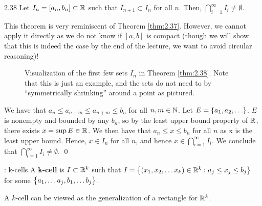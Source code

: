 \begin{theorem}{}{2.38}
    Let $I_n = [a_n, b_n] \subset \mathbb{R}$ such that $I_{n+1} \subset I_n$ for all $n$. Then, $\bigcap_{i=1}^\infty I_i \neq \emptyset$. 
\end{theorem}
\noindent This theorem is very reminiscent of Theorem \ref{thm:2.37}. However, we cannot apply it directly as we do not know if $[a, b]$ is compact (though we will show that this is indeed the case by the end of the lecture, we want to avoid circular reasoning)!
\begin{figure}[htbp]
    \centering
    \caption{Visualization of the first few sets $I_n$ in Theorem \ref{thm:2.38}. Note that this is just an example, and the sets do not need to by ``symmetrically shrinking'' around a point as pictured.}
    \label{fig12}
\end{figure}

\begin{nproof}
    We have that $a_n \leq a_{n + m} \leq a_{n + m} \leq b_n$ for all $n, m \in \mathbb{N}$. Let $E = \set{a_1, a_2, \ldots}$. $E$ is nonempty and bounded by any $b_n$, so by the least upper bound property of $\mathbb{R}$, there exists $x = \sup E \in \mathbb{R}$. We then have that $a_n \leq x \leq b_n$ for all $n$ as x is the least upper bound. Hence, $x \in I_n$ for all $n$, and hence $x \in \bigcap_{i=1}^\infty I_i$. We conclude that $\bigcap_{i=1}^\infty I_i \neq \emptyset$. \qed
\end{nproof}

\begin{ndef}{: k-cells}{}
    A \textbf{k-cell} is $I \subset \mathbb{R}^k$ such that $I = \set{(x_1, x_2, \ldots x_k) \in \mathbb{R}^k: a_j \leq x_j \leq b_j}$ for some $\set{a_1, \ldots a_j, b_1, \ldots b_j}$.
\end{ndef}
\noindent A $k$-cell can be viewed as the generalization of a rectangle for $\mathbb{R}^k$.

